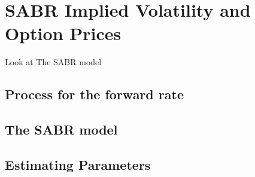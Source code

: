 \section{SABR Implied Volatility and Option Prices}

Look at The SABR model 

\subsection{Process for the forward rate}


\subsection{The SABR model}

\subsection{Estimating Parameters}